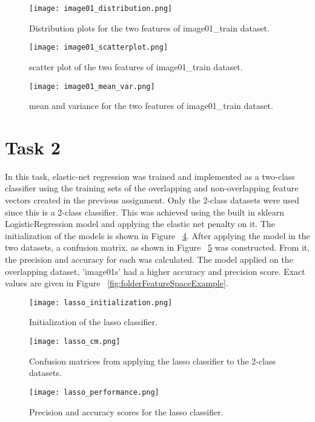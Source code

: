 \documentclass[sigconf]{acmart}
\begin{document}
\begin{figure}[h]
 \centering
    \texttt{[image: image01\_distribution.png]}
    \caption{Distribution plots for the two features of image01_train dataset.}
     \label{fig:image01_distribution}
\end{figure}
\begin{figure}[h]
 \centering
    \texttt{[image: image01\_scatterplot.png]}
    \caption{scatter plot of the two features of image01_train dataset.}
     \label{fig:image01_train_scatterplot}
\end{figure}
\begin{figure}[h]
 \centering
    \texttt{[image: image01\_mean\_var.png]}
    \caption{mean and variance for the two features of image01_train dataset.}
     \label{fig:image01_mean_var}
\end{figure}

\section{Task 2}
In this task, elastic-net regression was trained and implemented as a two-class classifier using the training sets of the overlapping and non-overlapping feature vectors created in the previous assignment. Only the 2-class datasets were used since this is a 2-class classifier. 
This was achieved using the built in sklearn LogisticRegression model and applying the elastic net penalty on it. The initialization of the models is shown in Figure ~\ref{fig:lasso_initialization}.
After applying the model in the two datasets, a confusion matrix, as shown in Figure ~\ref{fig:lasso_cm} was constructed. From it, the precision and accuracy for each was calculated. The model applied on the overlapping dataset, 'image01s' had a higher accuracy and precision score. Exact values are given in Figure ~\ref{fig:folderFeatureSpaceExample}.

\begin{figure}[h]
 \centering
    \texttt{[image: lasso\_initialization.png]}
    \caption{Initialization of the lasso classifier.}
     \label{fig:lasso_initialization}
\end{figure}
\begin{figure}[h]
 \centering
    \texttt{[image: lasso\_cm.png]}
    \caption{Confusion matrices from applying the lasso classifier to the 2-class datasets.}
     \label{fig:lasso_cm}
\end{figure}
\begin{figure}[h]
 \centering
    \texttt{[image: lasso\_performance.png]}
    \caption{Precision and accuracy scores for the lasso classifier.}
     \label{fig:lasso_performance}
\end{figure}
\end{document}
